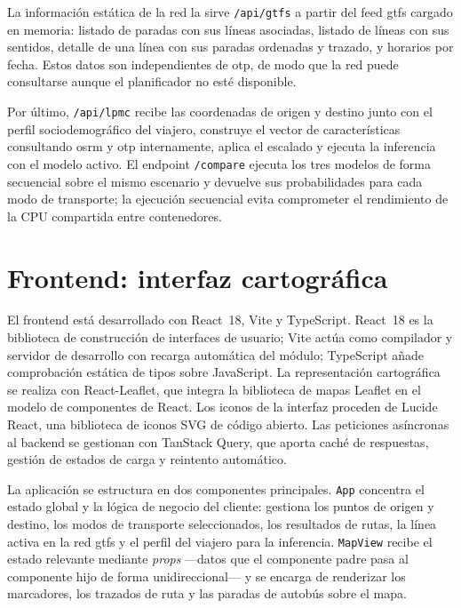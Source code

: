 La información estática de la red la sirve \texttt{/api/gtfs} a partir del feed \gls{gtfs} cargado en memoria: listado de paradas con sus líneas asociadas, listado de líneas con sus sentidos, detalle de una línea con sus paradas ordenadas y trazado, y horarios por fecha. Estos datos son independientes de \gls{otp}, de modo que la red puede consultarse aunque el planificador no esté disponible.

Por último, \texttt{/api/lpmc} recibe las coordenadas de origen y destino junto con el perfil sociodemográfico del viajero, construye el vector de características consultando \gls{osrm} y \gls{otp} internamente, aplica el escalado y ejecuta la inferencia con el modelo activo. El endpoint \texttt{/compare} ejecuta los tres modelos de forma secuencial sobre el mismo escenario y devuelve sus probabilidades para cada modo de transporte; la ejecución secuencial evita comprometer el rendimiento de la CPU compartida entre contenedores.

\section{Frontend: interfaz cartográfica}
\label{sec:arch_frontend}

El frontend está desarrollado con React~18, Vite y TypeScript. React~18 es la biblioteca de construcción de interfaces de usuario; Vite actúa como compilador y servidor de desarrollo con recarga automática del módulo; TypeScript añade comprobación estática de tipos sobre JavaScript. La representación cartográfica se realiza con React-Leaflet, que integra la biblioteca de mapas Leaflet en el modelo de componentes de React. Los iconos de la interfaz proceden de Lucide React, una biblioteca de iconos SVG de código abierto. Las peticiones asíncronas al backend se gestionan con TanStack Query, que aporta caché de respuestas, gestión de estados de carga y reintento automático.\newline

La aplicación se estructura en dos componentes principales. \texttt{App} concentra el estado global y la lógica de negocio del cliente: gestiona los puntos de origen y destino, los modos de transporte seleccionados, los resultados de rutas, la línea activa en la red \gls{gtfs} y el perfil del viajero para la inferencia. \texttt{MapView} recibe el estado relevante mediante \textit{props} —datos que el componente padre pasa al componente hijo de forma unidireccional— y se encarga de renderizar los marcadores, los trazados de ruta y las paradas de autobús sobre el mapa.\newline

